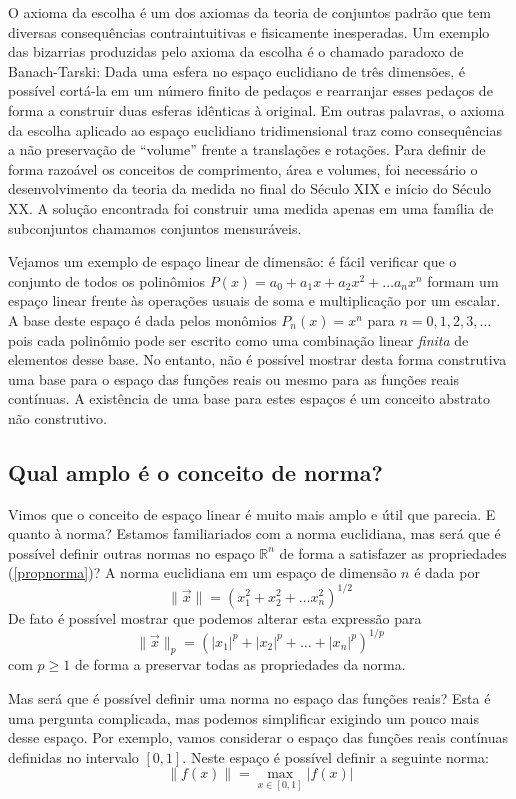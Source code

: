 O axioma da escolha é um dos axiomas da teoria de conjuntos padrão que tem diversas consequências contraintuitivas e fisicamente inesperadas. Um exemplo das bizarrias produzidas pelo axioma da escolha é o chamado paradoxo de Banach-Tarski: Dada uma esfera no espaço euclidiano de três dimensões, é possível cortá-la em um número finito de pedaços e rearranjar esses pedaços de forma a construir duas esferas idênticas à original. Em outras palavras, o axioma da escolha aplicado ao espaço euclidiano tridimensional traz como consequências a não preservação de ``volume'' frente a translações e rotações. Para definir de forma razoável os conceitos de comprimento, área e volumes, foi necessário o desenvolvimento da teoria da medida no final do Século XIX e início do Século XX. A solução encontrada foi construir uma medida apenas em uma família de subconjuntos chamamos conjuntos mensuráveis.

Vejamos um exemplo de espaço linear de dimensão: é fácil verificar que o conjunto de todos os polinômios $P(x)=a_0+a_1x+a_2x^2+\ldots a_nx^n$ formam um espaço linear frente às operações usuais de soma e multiplicação por um escalar. A base deste espaço é dada pelos monômios $P_{n}(x)=x^n$ para $n=0,1,2,3,\ldots$ pois cada polinômio pode ser escrito como uma combinação linear \emph{finita} de elementos desse base. No entanto, não é possível mostrar desta forma construtiva uma base para o espaço das funções reais ou mesmo para as funções reais contínuas. A existência de uma base para estes espaços é um conceito abstrato não construtivo.

\subsection{Qual amplo é o conceito de norma?}
Vimos que o conceito de espaço linear é muito mais amplo e útil que parecia. E quanto à norma? Estamos familiariados com a norma euclidiana, mas será que é possível definir outras normas no espaço $\mathbb{R}^n$ de forma a satisfazer as propriedades (\ref{propnorma})? A norma euclidiana em um espaço de dimensão $n$ é dada por
$$\|\vec{x}\|=\left(x_1^2+x_2^2+\ldots x_n^2\right)^{1/2}$$
De fato é possível mostrar que podemos alterar esta expressão para
$$\|\vec{x}\|_p=\left(|x_1|^p+|x_2|^p+\ldots +|x_n|^p\right)^{1/p}$$
com $p\geq 1$ de forma a preservar todas as propriedades da norma.

Mas será que é possível definir uma norma no espaço das funções reais? Esta é uma pergunta complicada, mas podemos simplificar exigindo um pouco mais desse espaço. Por exemplo, vamos considerar o espaço das funções reais contínuas definidas no intervalo $[0,1]$. Neste espaço é possível definir a seguinte norma:
\begin{equation}\label{norma_infinito}\|f(x)\|=\max_{x\in [0,1]}|f(x)|\end{equation}

